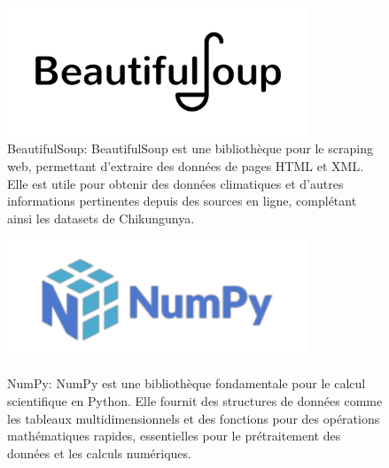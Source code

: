 \begin{figure}[h!]
	\centering
	\begin{minipage}[t]{0.46\textwidth}
		\centering
		\includegraphics[width=0.8\textwidth]{images/logobeautifulsoup} \\ %
		\caption[Logo BeautifulSoup]{BeautifulSoup: BeautifulSoup est une bibliothèque pour le scraping web, permettant d'extraire des données de pages HTML et XML. Elle est utile pour obtenir des données climatiques et d'autres informations pertinentes depuis des sources en ligne, complétant ainsi les datasets de Chikungunya.}
		\label{fig:beautifulsoup}
	\end{minipage}
	\hfill
	\begin{minipage}[t]{0.46\textwidth}
		\centering
		\includegraphics[width=0.8\textwidth]{images/logoNumpy} \\ %
		\caption[Logo Numpy]{NumPy: NumPy est une bibliothèque fondamentale pour le calcul scientifique en Python. Elle fournit des structures de données comme les tableaux multidimensionnels et des fonctions pour des opérations mathématiques rapides, essentielles pour le prétraitement des données et les calculs numériques.}
		\label{fig:numpy}
	\end{minipage}
\end{figure}

\vspace{1em}

